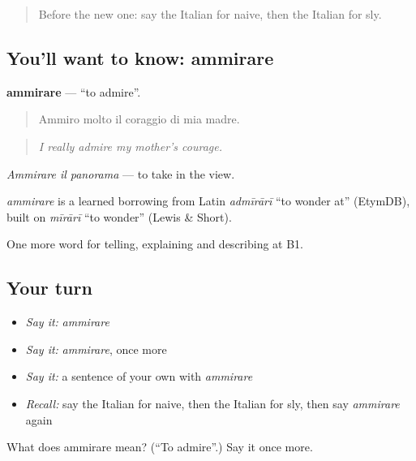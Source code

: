 \label{lesson:IT-C473-ammirare}



\begin{quote}
Before the new one: say the Italian for naive, then the Italian for sly.
\end{quote}

\subsection*{You'll want to know: ammirare}
\textbf{ammirare} — \textquotedblleft{}to admire\textquotedblright{}.

\begin{quote}
Ammiro molto il coraggio di mia madre.
\end{quote}

\begin{quote}
\emph{I really admire my mother's courage.}
\end{quote}

\emph{Ammirare il panorama} — to take in the view.

\begin{cousinweb}
\emph{ammirare} is a learned borrowing from Latin \emph{admīrārī} \textquotedblleft{}to wonder at\textquotedblright{} (EtymDB), built on \emph{mīrārī} \textquotedblleft{}to wonder\textquotedblright{} (Lewis \& Short).
\end{cousinweb}

\begin{grammarlens}[title={What you've built}]
One more word for telling, explaining and describing at B1.
\end{grammarlens}

\subsection*{Your turn}
\begin{itemize}
\raggedright
  \item \emph{Say it:} \emph{ammirare}
  \item \emph{Say it:} \emph{ammirare}, once more
  \item \emph{Say it:} a sentence of your own with \emph{ammirare}
  \item \emph{Recall:} say the Italian for naive, then the Italian for sly, then say \emph{ammirare} again
\end{itemize}

\begin{tcolorbox}[breakable,colback=teal!4,colframe=teal!35!black,title={Before you move on}]
What does ammirare mean? (\textquotedblleft{}To admire\textquotedblright{}.) Say it once more.
\end{tcolorbox}
